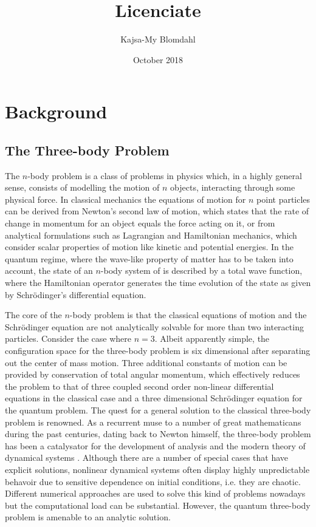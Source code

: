 \documentclass{article}
\title{Licenciate}
\author{Kajsa-My Blomdahl}
\date{October 2018}
\begin{document}
\maketitle

\tableofcontents

\section{Background}
\subsection{The Three-body Problem}
The $n$-body problem is a class of problems in physics which, in a highly general sense, consists of modelling the motion of $n$ objects, interacting through some physical force. In classical mechanics the equations of motion for $n$ point particles can be derived from Newton's second law of motion, which states that the rate of change in momentum for an object equals the force acting on it, or from analytical formulations such as Lagrangian and Hamiltonian mechanics, which consider scalar properties of motion like kinetic and potential energies. In the quantum regime, where the wave-like property of matter has to be taken into account, the state of an $n$-body system of is described by a total wave function, where the Hamiltonian operator generates the time evolution of the state as given by Schr{\"o}dinger's differential equation.

The core of the $n$-body problem is that the classical equations of motion and the Schr{\"o}dinger equation are not analytically solvable for more than two interacting particles. Consider the case where $n=3$. Albeit apparently simple, the configuration space for the three-body problem is six dimensional after separating out the center of mass motion. Three additional constants of motion can be provided by conservation of total angular momentum, which effectively reduces the problem to that of three coupled second order non-linear differential equations in the classical case and a three dimensional Schr{\"o}dinger equation for the quantum problem. The quest for a general solution to the classical three-body problem is renowned. As a recurrent muse to a number of great mathematicans during the past centuries, dating back to Newton himself, the three-body problem has been a catalysator for the development of analysis and the modern theory of dynamical systems \cite{Chenciner2015}. Although there are a number of special cases that have explicit solutions, nonlinear dynamical systems often display highly unpredictable behavoir due to sensitive dependence on initial conditions, i.e. they are chaotic. Different numerical approaches are used to solve this kind of problems nowadays but the computational load can be substantial. However, the quantum three-body problem is amenable to an analytic solution. 
\end{document}
